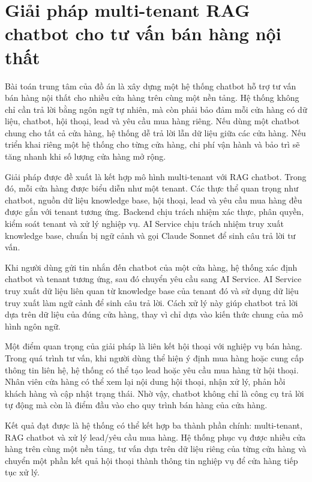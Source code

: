 \documentclass[../DoAn.tex]{subfiles}
\begin{document}
\section{Giải pháp multi-tenant RAG chatbot cho tư vấn bán hàng nội thất}
\label{section:5.1}

Bài toán trung tâm của đồ án là xây dựng một hệ thống chatbot hỗ trợ tư vấn bán hàng nội thất cho nhiều cửa hàng trên cùng một nền tảng. Hệ thống không chỉ cần trả lời bằng ngôn ngữ tự nhiên, mà còn phải bảo đảm mỗi cửa hàng có dữ liệu, chatbot, hội thoại, lead và yêu cầu mua hàng riêng. Nếu dùng một chatbot chung cho tất cả cửa hàng, hệ thống dễ trả lời lẫn dữ liệu giữa các cửa hàng. Nếu triển khai riêng một hệ thống cho từng cửa hàng, chi phí vận hành và bảo trì sẽ tăng nhanh khi số lượng cửa hàng mở rộng.

Giải pháp được đề xuất là kết hợp mô hình multi-tenant với RAG chatbot. Trong đó, mỗi cửa hàng được biểu diễn như một tenant. Các thực thể quan trọng như chatbot, nguồn dữ liệu knowledge base, hội thoại, lead và yêu cầu mua hàng đều được gắn với tenant tương ứng. Backend chịu trách nhiệm xác thực, phân quyền, kiểm soát tenant và xử lý nghiệp vụ. AI Service chịu trách nhiệm truy xuất knowledge base, chuẩn bị ngữ cảnh và gọi Claude Sonnet để sinh câu trả lời tư vấn.

Khi người dùng gửi tin nhắn đến chatbot của một cửa hàng, hệ thống xác định chatbot và tenant tương ứng, sau đó chuyển yêu cầu sang AI Service. AI Service truy xuất dữ liệu liên quan từ knowledge base của tenant đó và sử dụng dữ liệu truy xuất làm ngữ cảnh để sinh câu trả lời. Cách xử lý này giúp chatbot trả lời dựa trên dữ liệu của đúng cửa hàng, thay vì chỉ dựa vào kiến thức chung của mô hình ngôn ngữ.

Một điểm quan trọng của giải pháp là liên kết hội thoại với nghiệp vụ bán hàng. Trong quá trình tư vấn, khi người dùng thể hiện ý định mua hàng hoặc cung cấp thông tin liên hệ, hệ thống có thể tạo lead hoặc yêu cầu mua hàng từ hội thoại. Nhân viên cửa hàng có thể xem lại nội dung hội thoại, nhận xử lý, phản hồi khách hàng và cập nhật trạng thái. Nhờ vậy, chatbot không chỉ là công cụ trả lời tự động mà còn là điểm đầu vào cho quy trình bán hàng của cửa hàng.

Kết quả đạt được là hệ thống có thể kết hợp ba thành phần chính: multi-tenant, RAG chatbot và xử lý lead/yêu cầu mua hàng. Hệ thống phục vụ được nhiều cửa hàng trên cùng một nền tảng, tư vấn dựa trên dữ liệu riêng của từng cửa hàng và chuyển một phần kết quả hội thoại thành thông tin nghiệp vụ để cửa hàng tiếp tục xử lý.
\end{document}

